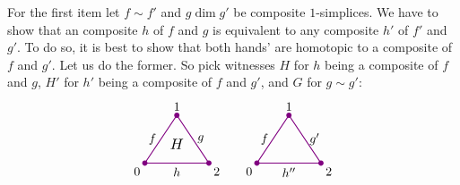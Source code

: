         For the first item let $f \sim f'$ and $g \dim g'$ be composite $1$-simplices. We have to show that an composite $h$ of $f$ and $g$ is equivalent to any composite $h'$ of $f'$ and $g'$. To do so, it is best to show that both hands' are homotopic to a composite of $f$ and $g'$. Let us do the former. So pick witnesses $H$ for $h$ being a composite of $f$ and $g$, $H'$ for $h'$ being a composite of $f$ and $g'$, and $G$ for $g \sim g'$:        
        \begin{equation*}
            \begin{tikzpicture}[
                scale=0.9,
                thick,
                color=violet, %
                every node/.style={text=black},
                dot/.style={circle, fill=violet, inner sep=1.5pt, outer sep=0pt}
            ]

                \begin{scope}[shift={(0,0)}]
                    \coordinate (A1) at (0,0);
                    \coordinate (B1) at (1,1.5);
                    \coordinate (C1) at (2,0);

                    \draw (A1) -- node[left] {$f$} (B1)
                        -- node[right] {$g$} (C1)
                        -- node[below] {$h$} (A1);

                    \node[dot] at (A1) {}; \node[below left] at (A1) {0};
                    \node[dot] at (B1) {}; \node[above]      at (B1) {1};
                    \node[dot] at (C1) {}; \node[below right] at (C1) {2};

                    \node[scale=1.2] at (1, 0.6) {$H$};
                \end{scope}

                \begin{scope}[shift={(3.5,0)}]
                    \coordinate (A2) at (0,0);
                    \coordinate (B2) at (1,1.5);
                    \coordinate (C2) at (2,0);

                    \draw (A2) -- node[left] {$f$} (B2)
                        -- node[right] {$g'$} (C2)
                        -- node[below] {$h''$} (A2); %

                    \node[dot] at (A2) {}; \node[below left] at (A2) {0};
                    \node[dot] at (B2) {}; \node[above]      at (B2) {1};
                    \node[dot] at (C2) {}; \node[below right] at (C2) {2};


\end{scope}
\end{tikzpicture}
\end{equation*}
